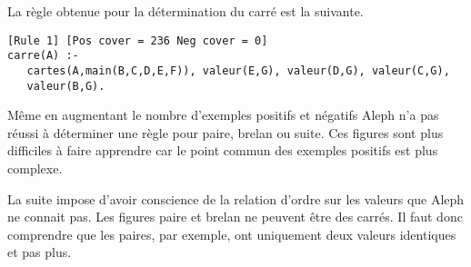 \documentclass[a4paper,12pt]{article}
\begin{document}
La règle obtenue pour la détermination du carré est la suivante.

\begin{lstlisting}[frame=single]
[Rule 1] [Pos cover = 236 Neg cover = 0]
carre(A) :-
   cartes(A,main(B,C,D,E,F)), valeur(E,G), valeur(D,G), valeur(C,G), 
   valeur(B,G).
\end{lstlisting}

Même en augmentant le nombre d'exemples positifs et négatifs Aleph n'a pas réussi à déterminer une règle pour paire, brelan ou suite.
Ces figures sont plus difficiles à faire apprendre car le point commun des exemples positifs est plus complexe.

La suite impose d'avoir conscience de la relation d'ordre sur les valeurs que Aleph ne connait pas.
Les figures paire et brelan ne peuvent être des carrés.
Il faut donc comprendre que les paires, par exemple, ont uniquement deux valeurs identiques et pas plus.
\end{document}
